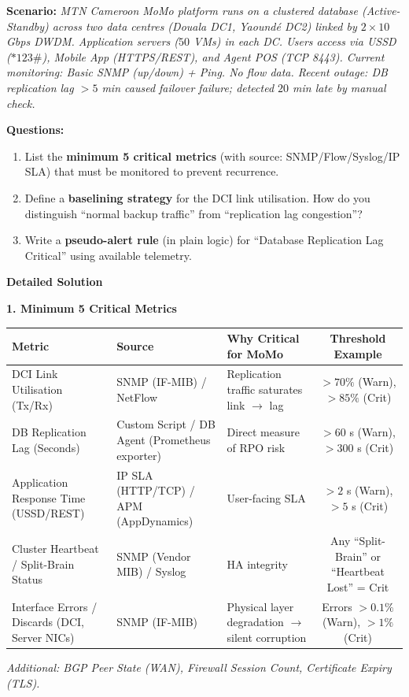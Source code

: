 \documentclass[11pt]{article}
\begin{document}
\begin{exoresolu}
\textbf{Scenario:} \textit{MTN Cameroon MoMo platform runs on a clustered database (Active-Standby) across two data centres (Douala DC1, Yaound\'e DC2) linked by $2 \times 10$ Gbps DWDM. Application servers ($50$ VMs) in each DC. Users access via USSD ($*123\#$), Mobile App (HTTPS/REST), and Agent POS (TCP 8443). Current monitoring: Basic SNMP (up/down) + Ping. No flow data. Recent outage: DB replication lag $> 5$ min caused failover failure; detected $20$ min late by manual check.}

\textbf{Questions:}
\begin{enumerate}
    \item List the \textbf{minimum 5 critical metrics} (with source: SNMP/Flow/Syslog/IP SLA) that must be monitored to prevent recurrence.
    \item Define a \textbf{baselining strategy} for the DCI link utilisation. How do you distinguish ``normal backup traffic'' from ``replication lag congestion''?
    \item Write a \textbf{pseudo-alert rule} (in plain logic) for ``Database Replication Lag Critical'' using available telemetry.
\end{enumerate}
\tcblower
\textbf{Detailed Solution}

\noindent\textbf{1. Minimum 5 Critical Metrics}

\begin{center}
\begin{tabularx}{\linewidth}{|l|l|X|c|}
\hline
\rowcolor{popblueL}
\textbf{Metric} & \textbf{Source} & \textbf{Why Critical for MoMo} & \textbf{Threshold Example} \\
\hline
DCI Link Utilisation (Tx/Rx) & SNMP (IF-MIB) / NetFlow & Replication traffic saturates link $\rightarrow$ lag & $> 70\%$ (Warn), $> 85\%$ (Crit) \\
\hline
DB Replication Lag (Seconds) & Custom Script / DB Agent (Prometheus exporter) & Direct measure of RPO risk & $> 60$ s (Warn), $> 300$ s (Crit) \\
\hline
Application Response Time (USSD/REST) & IP SLA (HTTP/TCP) / APM (AppDynamics) & User-facing SLA & $> 2$ s (Warn), $> 5$ s (Crit) \\
\hline
Cluster Heartbeat / Split-Brain Status & SNMP (Vendor MIB) / Syslog & HA integrity & Any ``Split-Brain'' or ``Heartbeat Lost'' = Crit \\
\hline
Interface Errors / Discards (DCI, Server NICs) & SNMP (IF-MIB) & Physical layer degradation $\rightarrow$ silent corruption & Errors $> 0.1\%$ (Warn), $> 1\%$ (Crit) \\
\hline
\end{tabularx}
\end{center}
\textit{Additional: BGP Peer State (WAN), Firewall Session Count, Certificate Expiry (TLS).}


\end{exoresolu}
\end{document}
